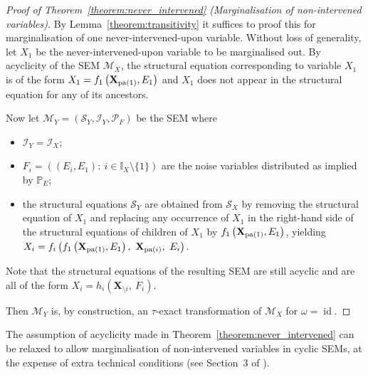 \medskip


\begin{proof}[Proof of Theorem~\ref{theorem:never_intervened} (Marginalisation of non-intervened variables)]
By Lemma~\ref{theorem:transitivity} it suffices to proof this for marginalisation of one never-intervened-upon variable.
Without loss of generality, let $X_1$ be the never-intervened-upon variable to be marginalised out.
By acyclicity of the SEM $\mathcal{M}_X$, the structural equation corresponding to variable $X_1$ is of the form $X_1 = f_1\left(\mathbf{X}_{\operatorname{pa}(1)},E_1\right)$ and $X_1$ does not appear in the structural equation for any of its ancestors.

Now let $\mathcal{M}_Y=(\mathcal{S}_Y,\mathcal{I}_Y,\mathcal{P}_F)$ be the SEM where
%
\begin{itemize}
    \item $\mathcal{I}_Y = \mathcal{I}_X$;
    \item $F_i = ((E_i,E_1):\ i \in \mathbb{I}_X\setminus\{1\})$ are the noise variables distributed as implied by $\mathbb{P}_E$;
    \item the structural equations $\mathcal{S}_Y$ are obtained from $\mathcal{S}_X$ by removing the structural equation of $X_1$ and replacing any occurrence of $X_1$ in the right-hand side of the structural equations of children of $X_1$ by $f_1\left(\mathbf{X}_{\operatorname{pa}(1)},E_1\right)$, yielding $X_i = f_i\left(f_1\left(\mathbf{X}_{\pa(1)},E_1\right),\ \mathbf{X}_{\pa(i)},\ E_i\right)$.
\end{itemize}
%
Note that the structural equations  of the resulting SEM are still acyclic and are all of the form $X_i = h_i\left(\mathbf{X}_{\setminus i},\ F_i\right)$.

Then $\mathcal{M}_Y$ is, by construction, an $\tau$-exact transformation of $\mathcal{M}_X$ for $\omega=\operatorname{id}$.
%
\end{proof}

The assumption of acyclicity made in Theorem~\ref{theorem:never_intervened} can be relaxed to allow marginalisation of non-intervened variables in cyclic SEMs, at the expense of extra technical conditions (see Section~3 of \cite{bongers2016structural}).


